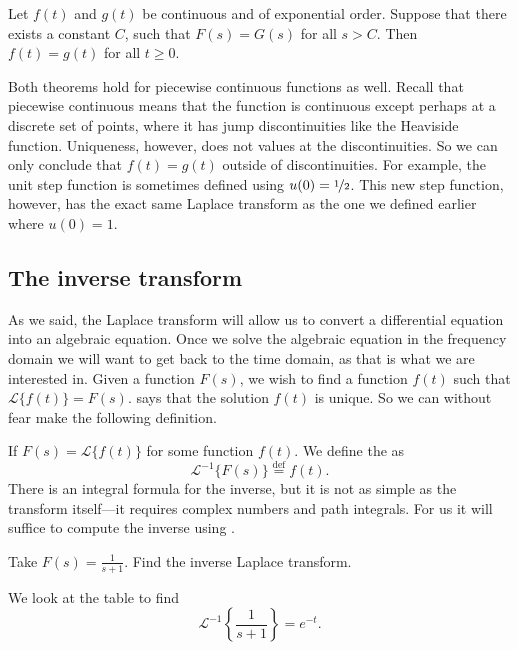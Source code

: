 \begin{theorem}[Uniqueness] \label{lt:uniqthm}
Let $f(t)$ and $g(t)$ be continuous and of exponential order.
Suppose that there exists a constant $C$,
such that $F(s) = G(s)$ for all $s > C$.
Then $f(t) = g(t)$ for all $t \geq 0$.
\end{theorem}

Both theorems hold for piecewise continuous functions as well.
Recall that piecewise continuous means that the function
is continuous except perhaps at a discrete set of points, where it has jump
discontinuities like the Heaviside function.  Uniqueness, however, does
not  values at the discontinuities.  So we can only conclude that
$f(t) = g(t)$ outside of discontinuities.  For example, the unit step
function is sometimes defined using $u(0) = \nicefrac{1}{2}$.  This new
step function, however, has the exact same Laplace transform
as the one we defined earlier where $u(0) = 1$.

\subsection{The inverse transform}

As we said, the Laplace transform will allow us to convert a differential
equation into an algebraic equation.  Once we solve the
algebraic equation in the frequency domain we will want to get back to the
time domain, as that is what we are interested in.
Given a function
$F(s)$, we wish to find a function
$f(t)$ such that $\mathcal{L} \bigl\{ f(t) \bigr\} = F(s)$.
 says that the solution $f(t)$ is unique.
So we can without fear make the following definition.

If $F(s) = \mathcal{L} \bigl\{ f(t) \bigr\}$ for some function $f(t)$.  We define the
\emph{} as
\begin{equation*}
{\mathcal{L}}^{-1} \bigl\{ F(s) \bigr\} \overset{\text{def}}{=} f(t) .
\end{equation*}
There is an integral formula for the inverse, but it is not as simple
as the transform itself---it requires complex numbers and path integrals.
For us it will
suffice to
compute the inverse using .

\begin{example}
Take
$F(s) = \frac{1}{s+1}$.  Find the inverse Laplace transform.

We look at the table to find
\begin{equation*}
{\mathcal{L}}^{-1} \left\{ \frac{1}{s+1} \right\} = 
e^{-t} .
\end{equation*}
\end{example}

